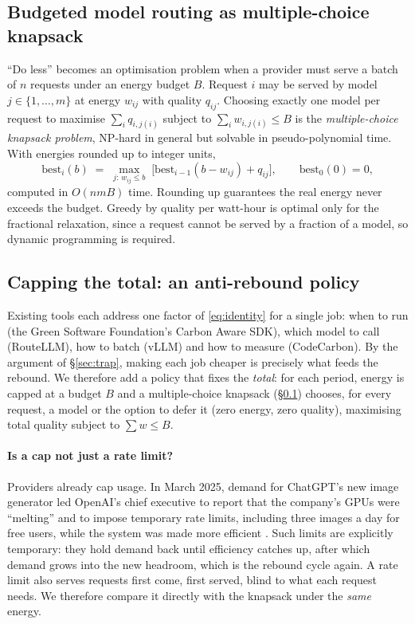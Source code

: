 \documentclass[11pt]{article}
\theoremstyle{definition}
\theoremstyle{remark}
\begin{document}
\subsection{Budgeted model routing as multiple-choice knapsack}\label{sec:router}
``Do less'' becomes an optimisation problem when a provider must serve a batch of $n$ requests under an energy budget $B$. Request $i$ may be served by model $j\in\{1,\dots,m\}$ at energy $w_{ij}$ with quality $q_{ij}$. Choosing exactly one model per request to maximise $\sum_i q_{i,j(i)}$ subject to $\sum_i w_{i,j(i)}\le B$ is the \emph{multiple-choice knapsack problem}, NP-hard in general but solvable in pseudo-polynomial time. With energies rounded up to integer units,
\begin{equation}
  \mathrm{best}_i(b) \;=\; \max_{j:\,w_{ij}\le b}\;\bigl[\mathrm{best}_{i-1}(b-w_{ij}) + q_{ij}\bigr],
  \qquad \mathrm{best}_0(0)=0,
\end{equation}
computed in $O(nmB)$ time. Rounding up guarantees the real energy never exceeds the budget. Greedy by quality per watt-hour is optimal only for the fractional relaxation, since a request cannot be served by a fraction of a model, so dynamic programming is required.


\subsection{Capping the total: an anti-rebound policy}\label{sec:cap}
Existing tools each address one factor of \eqref{eq:identity} for a single job: when to run (the Green Software Foundation's Carbon Aware SDK), which model to call (RouteLLM), how to batch (vLLM) and how to measure (CodeCarbon). By the argument of \S\ref{sec:trap}, making each job cheaper is precisely what feeds the rebound. We therefore add a policy that fixes the \emph{total}: for each period, energy is capped at a budget $B$ and a multiple-choice knapsack (\S\ref{sec:router}) chooses, for every request, a model or the option to defer it (zero energy, zero quality), maximising total quality subject to $\sum w \le B$.

\paragraph{Is a cap not just a rate limit?} Providers already cap usage. In March 2025, demand for ChatGPT's new image generator led OpenAI's chief executive to report that the company's GPUs were ``melting'' and to impose temporary rate limits, including three images a day for free users, while the system was made more efficient \citep{altman2025}. Such limits are explicitly temporary: they hold demand back until efficiency catches up, after which demand grows into the new headroom, which is the rebound cycle again. A rate limit also serves requests first come, first served, blind to what each request needs. We therefore compare it directly with the knapsack under the \emph{same} energy.
\end{document}
